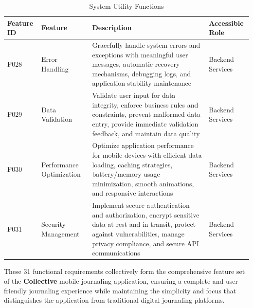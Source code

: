 \newpage

\begin{table}[H]
\centering
\caption{System Utility Functions}
\label{tab:system-utility-functions}
\begin{tabular}{|p{0.8cm}|p{2.2cm}|p{9.5cm}|p{1.5cm}|}
\hline
\textbf{Feature ID} & \textbf{Feature} & \textbf{Description} & \textbf{Accessible Role} \\
\hline
F028 & Error Handling & Gracefully handle system errors and exceptions with meaningful user messages, automatic recovery mechanisms, debugging logs, and application stability maintenance & Backend Services \\
\hline
F029 & Data Validation & Validate user input for data integrity, enforce business rules and constraints, prevent malformed data entry, provide immediate validation feedback, and maintain data quality & Backend Services \\
\hline
F030 & Performance Optimization & Optimize application performance for mobile devices with efficient data loading, caching strategies, battery/memory usage minimization, smooth animations, and responsive interactions & Backend Services \\
\hline
F031 & Security Management & Implement secure authentication and authorization, encrypt sensitive data at rest and in transit, protect against vulnerabilities, manage privacy compliance, and secure API communications & Backend Services \\
\hline
\end{tabular}
\end{table}

These 31 functional requirements collectively form the comprehensive feature set of the \textbf{Collective} mobile journaling application, ensuring a complete and user-friendly journaling experience while maintaining the simplicity and focus that distinguishes the application from traditional digital journaling platforms.
